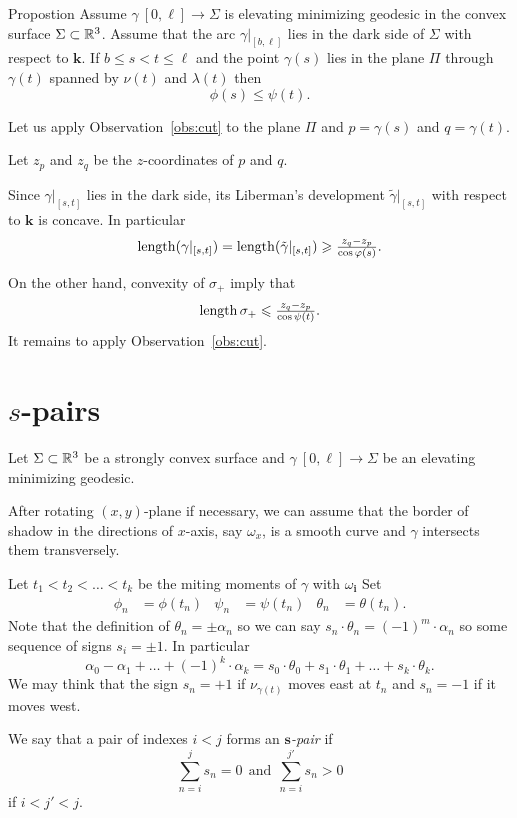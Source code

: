 \documentclass[a4paper,10pt]{amsart}
\begin{document}
\begin{thm}{Propostion}\label{prop:phi-psi}
Assume $\gamma\:[0,\ell]\to \Sigma$ is elevating minimizing geodesic in the convex surface $\Sigma\subset \mathbb{R}^3$.
Assume that the arc $\gamma|_{[b,\ell]}$ lies in the dark side of $\Sigma$ with respect to $\bm{k}$.
If $b\le s<t\le \ell$ and the point $\gamma(s)$ lies in the plane $\Pi$ through $\gamma(t)$ spanned by $\nu(t)$ and $\lambda(t)$
then 
\[\phi(s)\le \psi(t).\]
\end{thm}

Let us apply Observation~\ref{obs:cut} to the plane $\Pi$ and $p=\gamma(s)$ and $q=\gamma(t)$.

Let $z_p$ and $z_q$ be the $z$-coordinates of $p$ and $q$.

Since $\gamma|_{[s,t]}$ lies in the dark side,
its Liberman's development $\tilde\gamma|_{[s,t]}$ 
with respect to $\bm{k}$ is concave.
In particular 
\[\mathop{\rm length}\nolimits(\gamma|_{[s,t]})
=
\mathop{\rm length}\nolimits(\tilde\gamma|_{[s,t]})
\geqslant
\tfrac{z_q-z_p}{\cos\varphi(s)}.\]

On the other hand, convexity of $\sigma_+$ imply that
\[\mathop{\rm length}\nolimits\sigma_+\leqslant \tfrac{z_q-z_p}{\cos\psi(t)}.\]
It remains to apply Observation~\ref{obs:cut}.
\qeds

\section{$s$-pairs}

Let $\Sigma\subset \mathbb{R}^3$ 
be a strongly convex surface
and $\gamma\:[0,\ell]\to\Sigma$ be an elevating minimizing geodesic.

After rotating $(x,y)$-plane if necessary, 
we can assume that the border of shadow in the directions of $x$-axis, say $\omega_x$, 
is a smooth curve and $\gamma$ intersects them transversely.

Let $t_1<t_2<\dots<t_k$ be the miting moments of $\gamma$ with $\omega_{\bm{i}}$
Set
\begin{align*}
\phi_n&=\phi(t_n)
&
\psi_n&=\psi(t_n)
&
\theta_n&=\theta(t_n).
\end{align*}
Note that the definition of $\theta_n=\pm\alpha_n$
so we can say $s_n\cdot\theta_n=(-1)^m\cdot \alpha_n$ so some sequence of signs $s_i=\pm1$.
In particular
\[\alpha_0-\alpha_1+\dots+(-1)^k\cdot\alpha_k
=
s_0\cdot\theta_0+s_1\cdot\theta_1+\dots+s_k\cdot\theta_k.\]
We may think that the sign $s_n=+1$ if $\nu_{\gamma(t)}$ moves east 
at $t_n$
and $s_n=-1$ if it moves west.    

We say that a pair of indexes $i<j$
forms an \emph{$\bm{s}$-pair} 
if 
\[
\sum_{n=i}^js_n=0\ \ 
\text{and}\ \ 
\sum_{n=i}^{j'}s_n>0
\]
if $i<j'<j$.
\end{document}
